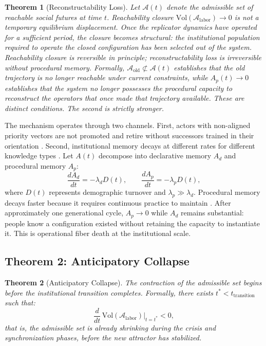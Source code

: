 \documentclass[12pt, a4paper]{article}
\theoremstyle{named}
\newtheorem{theorem}{Theorem}
\newenvironment{boxedtheorem}[1]{%
  \begin{thmbox}\begin{theorem}[#1]%
}{%
  \end{theorem}\end{thmbox}%
}
\begin{document}
\begin{boxedtheorem}{Reconstructability Loss}
Let $\mathcal{A}(t)$ denote the admissible set of reachable social
futures at time $t$. Reachability closure $\mathrm{Vol}(\mathcal{A}_{\text{labor}}) \to 0$
is not a temporary equilibrium displacement. Once the replicator
dynamics have operated for a sufficient period, the closure becomes
structural: the institutional population required to operate the
closed configuration has been selected out of the system. Reachability
closure is reversible in principle; reconstructability loss is
irreversible without procedural memory. Formally,
$\mathcal{A}_{\text{old}} \not\subset \mathcal{A}(t)$ establishes that
the old trajectory is no longer reachable under current constraints,
while $A_p(t) \to 0$ establishes that the system no longer possesses
the procedural capacity to reconstruct the operators that once made
that trajectory available. These are distinct conditions. The second
is strictly stronger.
\end{boxedtheorem}

The mechanism operates through two channels. First, actors with
non-aligned priority vectors are not promoted and retire without
successors trained in their orientation \cite{march1991,teece1997}.
Second, institutional memory decays at different rates for different
knowledge types \cite{nelsonwinter1982,weick1995}. Let $A(t)$
decompose into declarative memory $A_d$ and procedural memory $A_p$:
\[
  \frac{dA_d}{dt} = -\lambda_d D(t), \qquad
  \frac{dA_p}{dt} = -\lambda_p D(t),
\]
where $D(t)$ represents demographic turnover and $\lambda_p \gg
\lambda_d$. Procedural memory decays faster because it requires
continuous practice to maintain \cite{arrow1962,arthur1994}. After
approximately one generational cycle, $A_p \to 0$ while $A_d$ remains
substantial: people know a configuration existed without retaining the
capacity to instantiate it. This is operational fiber death at the
institutional scale.



\subsection{Theorem 2: Anticipatory Collapse}

\begin{theorem}[Anticipatory Collapse]
The contraction of the admissible set begins before the institutional
transition completes. Formally, there exists $t^{\ast} < t_{\text{transition}}$
such that:
\[
  \frac{d}{dt}\,\mathrm{Vol}(\mathcal{A}_{\text{labor}})\big|_{t=t^{\ast}} < 0,
\]
that is, the admissible set is already shrinking during the crisis and
synchronization phases, before the new attractor has stabilized.
\end{theorem}
\end{document}
